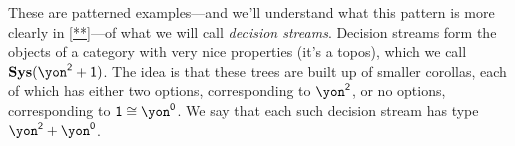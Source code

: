 \documentclass[Book-Poly]{subfiles}
\begin{document}
These are patterned examples---and we'll understand what this pattern is more clearly in \cref{**}---of what we will call \emph{decision streams}.
Decision streams form the objects of a category with very nice properties (it's a topos), which we call $\sys(\yon^\2+\1)$. The idea is that these trees are built up of smaller corollas, each of which has either two options, corresponding to $\yon^\2$, or no options, corresponding to $\1\iso\yon^\0$.
We say that each such decision stream has type $\yon^\2+\yon^\0$.
\end{document}
